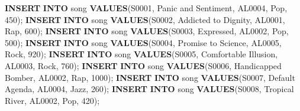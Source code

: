 \documentclass[
]{article}
\newenvironment{Shaded}{}{}
\newcommand{\DecValTok}[1]{\textcolor[rgb]{0.25,0.63,0.44}{#1}}
\newcommand{\KeywordTok}[1]{\textcolor[rgb]{0.00,0.44,0.13}{\textbf{#1}}}
\newcommand{\NormalTok}[1]{#1}
\newcommand{\StringTok}[1]{\textcolor[rgb]{0.25,0.44,0.63}{#1}}
\begin{document}
\begin{Shaded}
\begin{Highlighting}[]
\KeywordTok{INSERT} \KeywordTok{INTO}\NormalTok{ song }\KeywordTok{VALUES}\NormalTok{(}\StringTok{\textquotesingle{}S0001\textquotesingle{}}\NormalTok{, }\StringTok{\textquotesingle{}Panic and Sentiment\textquotesingle{}}\NormalTok{, }\StringTok{\textquotesingle{}AL0004\textquotesingle{}}\NormalTok{, }\StringTok{\textquotesingle{}Pop\textquotesingle{}}\NormalTok{, }\DecValTok{450}\NormalTok{);}
\KeywordTok{INSERT} \KeywordTok{INTO}\NormalTok{ song }\KeywordTok{VALUES}\NormalTok{(}\StringTok{\textquotesingle{}S0002\textquotesingle{}}\NormalTok{, }\StringTok{\textquotesingle{}Addicted to Dignity\textquotesingle{}}\NormalTok{, }\StringTok{\textquotesingle{}AL0001\textquotesingle{}}\NormalTok{, }\StringTok{\textquotesingle{}Rap\textquotesingle{}}\NormalTok{, }\DecValTok{600}\NormalTok{);}
\KeywordTok{INSERT} \KeywordTok{INTO}\NormalTok{ song }\KeywordTok{VALUES}\NormalTok{(}\StringTok{\textquotesingle{}S0003\textquotesingle{}}\NormalTok{, }\StringTok{\textquotesingle{}Expressed\textquotesingle{}}\NormalTok{, }\StringTok{\textquotesingle{}AL0002\textquotesingle{}}\NormalTok{, }\StringTok{\textquotesingle{}Pop\textquotesingle{}}\NormalTok{, }\DecValTok{500}\NormalTok{);}
\KeywordTok{INSERT} \KeywordTok{INTO}\NormalTok{ song }\KeywordTok{VALUES}\NormalTok{(}\StringTok{\textquotesingle{}S0004\textquotesingle{}}\NormalTok{, }\StringTok{\textquotesingle{}Promise to Science\textquotesingle{}}\NormalTok{, }\StringTok{\textquotesingle{}AL0005\textquotesingle{}}\NormalTok{, }\StringTok{\textquotesingle{}Rock\textquotesingle{}}\NormalTok{, }\DecValTok{920}\NormalTok{);}
\KeywordTok{INSERT} \KeywordTok{INTO}\NormalTok{ song }\KeywordTok{VALUES}\NormalTok{(}\StringTok{\textquotesingle{}S0005\textquotesingle{}}\NormalTok{, }\StringTok{\textquotesingle{}Comfortable Illusion\textquotesingle{}}\NormalTok{, }\StringTok{\textquotesingle{}AL0003\textquotesingle{}}\NormalTok{, }\StringTok{\textquotesingle{}Rock\textquotesingle{}}\NormalTok{, }\DecValTok{760}\NormalTok{);}
\KeywordTok{INSERT} \KeywordTok{INTO}\NormalTok{ song }\KeywordTok{VALUES}\NormalTok{(}\StringTok{\textquotesingle{}S0006\textquotesingle{}}\NormalTok{, }\StringTok{\textquotesingle{}Handicapped Bomber\textquotesingle{}}\NormalTok{, }\StringTok{\textquotesingle{}AL0002\textquotesingle{}}\NormalTok{, }\StringTok{\textquotesingle{}Rap\textquotesingle{}}\NormalTok{, }\DecValTok{1000}\NormalTok{);}
\KeywordTok{INSERT} \KeywordTok{INTO}\NormalTok{ song }\KeywordTok{VALUES}\NormalTok{(}\StringTok{\textquotesingle{}S0007\textquotesingle{}}\NormalTok{, }\StringTok{\textquotesingle{}Default Agenda\textquotesingle{}}\NormalTok{, }\StringTok{\textquotesingle{}AL0004\textquotesingle{}}\NormalTok{, }\StringTok{\textquotesingle{}Jazz\textquotesingle{}}\NormalTok{, }\DecValTok{260}\NormalTok{);}
\KeywordTok{INSERT} \KeywordTok{INTO}\NormalTok{ song }\KeywordTok{VALUES}\NormalTok{(}\StringTok{\textquotesingle{}S0008\textquotesingle{}}\NormalTok{, }\StringTok{\textquotesingle{}Tropical River\textquotesingle{}}\NormalTok{, }\StringTok{\textquotesingle{}AL0002\textquotesingle{}}\NormalTok{, }\StringTok{\textquotesingle{}Pop\textquotesingle{}}\NormalTok{, }\DecValTok{420}\NormalTok{);}


\end{Highlighting}
\end{Shaded}
\end{document}
